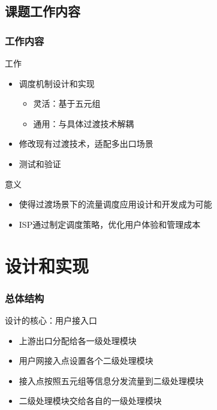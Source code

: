 \documentclass{beamer}
\begin{document}
\subsection{课题工作内容}
\begin{frame}
  \frametitle{工作内容}

  \begin{block}{工作}
    \begin{itemize}
    \item 调度机制设计和实现
      \begin{itemize}
      \item 灵活：基于五元组
      \item 通用：与具体过渡技术解耦
      \end{itemize}
    \item 修改现有过渡技术，适配多出口场景
    \item 测试和验证
    \end{itemize}
  \end{block}

  \begin{block}{意义}
    \begin{itemize}
    \item 使得过渡场景下的流量调度应用设计和开发成为可能
    \item ISP通过制定调度策略，优化用户体验和管理成本
    \end{itemize}
  \end{block}
\end{frame}

\section{设计和实现}
\begin{frame}
  \frametitle{总体结构}

  \begin{block}{设计的核心：用户接入口}
    \begin{itemize}
    \item 上游出口分配给各一级处理模块
    \item 用户网接入点设置各个二级处理模块
    \item 接入点按照五元组等信息分发流量到二级处理模块
    \item 二级处理模块交给各自的一级处理模块
    \end{itemize}
  \end{block}
\end{frame}
\end{document}
